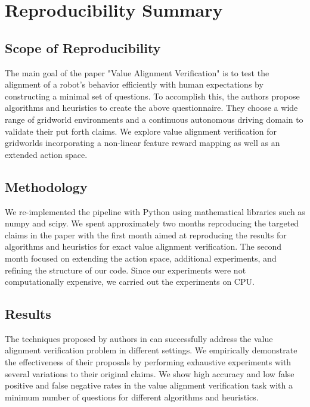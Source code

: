 \newtheorem{thm}{Theorem}
\newtheorem{corollary}{Corollary}
\newtheorem{defn}{Definition}
\newtheorem{lemma}{Lemma}
\newtheorem{case}{Case}


\section*{\centering Reproducibility Summary}

\subsection*{Scope of Reproducibility}
The main goal of the paper "Value Alignment Verification" \cite{brown2021value} is to test the alignment of a robot's behavior efficiently with human expectations by constructing a minimal set of questions. To accomplish this, the authors propose algorithms and heuristics to create the above questionnaire. They choose a wide range of gridworld environments and a continuous autonomous driving domain to validate their put forth claims. We explore value alignment verification for gridworlds incorporating a non-linear feature reward mapping as well as an extended action space.

\subsection*{Methodology}

We re-implemented the pipeline with Python using mathematical libraries such as \\ numpy and scipy. We spent approximately two months reproducing the targeted claims in the paper with the first month aimed at  reproducing the results for algorithms and heuristics for exact value alignment verification. The second month focused on extending  the action space, additional experiments, and refining the structure of our code. Since our experiments were not computationally  expensive, we carried out the experiments on CPU.

\subsection*{Results}
The techniques proposed by authors in \cite{brown2021value} can successfully address the value alignment verification problem in different settings. We empirically demonstrate the effectiveness of their proposals by performing exhaustive experiments with several variations to their original claims. We show high accuracy and low false positive and false negative rates in the value alignment verification task with a minimum number of questions for different algorithms and heuristics.

